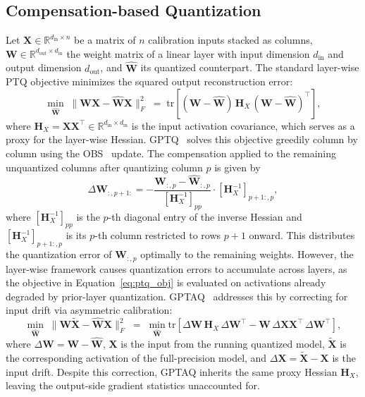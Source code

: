 \documentclass{article} %
\begin{document}
\subsection{Compensation-based Quantization}
\label{sec:bg:ptq}
Let $\mathbf{X} \in \mathbb{R}^{d_{\mathrm{in}} \times n}$ be a matrix of $n$ calibration inputs stacked as columns, $\mathbf{W} \in \mathbb{R}^{d_{\mathrm{out}} \times d_{\mathrm{in}}}$ the weight matrix of a linear layer with input dimension $d_{\mathrm{in}}$ and output dimension $d_{\mathrm{out}}$, and $\widehat{\mathbf{W}}$ its quantized counterpart. The standard layer-wise PTQ objective minimizes the squared output reconstruction error:
\begin{equation}
    \min_{\widehat{\mathbf{W}}} \; \|\mathbf{W}\mathbf{X} - \widehat{\mathbf{W}}\mathbf{X}\|_F^2
    \;=\;
    \mathrm{tr}\!\left[(\mathbf{W} - \widehat{\mathbf{W}})\, \mathbf{H}_X\, (\mathbf{W} - \widehat{\mathbf{W}})^\top\right],
    \label{eq:ptq_obj}
\end{equation}
where $\mathbf{H}_X = \mathbf{X}\mathbf{X}^\top \in \mathbb{R}^{d_{\mathrm{in}} \times d_{\mathrm{in}}}$ is the input activation covariance, which serves as a proxy for the layer-wise Hessian. GPTQ~\citep{frantar2022gptq} solves this objective greedily column by column using the OBS~\citep{hassibi1992second} update. The compensation applied to the remaining unquantized columns after quantizing column $p$ is given by
\begin{equation}
    \Delta\mathbf{W}_{:,p+1:}
    = -\frac{\mathbf{W}_{:,p} - \widehat{\mathbf{W}}_{:,p}}{[\mathbf{H}_X^{-1}]_{pp}}
      \cdot [\mathbf{H}_X^{-1}]_{p+1:,p},
    \label{eq:obs_update}
\end{equation}
where $[\mathbf{H}_X^{-1}]_{pp}$ is the $p$-th diagonal entry of the inverse Hessian and $[\mathbf{H}_X^{-1}]_{p+1:,p}$ is its $p$-th column restricted to rows $p+1$ onward. This distributes the quantization error of $\mathbf{W}_{:,p}$ optimally to the remaining weights. However, the layer-wise framework causes quantization errors to accumulate across layers, as the objective in Equation~\eqref{eq:ptq_obj} is evaluated on activations already degraded by prior-layer quantization. GPTAQ~\citep{li2025gptaq} addresses this by correcting for input drift via asymmetric calibration:
\begin{equation}
    \min_{\widehat{\mathbf{W}}} \; \|\mathbf{W}\widetilde{\mathbf{X}} - 
    \widehat{\mathbf{W}}\mathbf{X}\|_F^2
    \;=\;
    \min_{\widehat{\mathbf{W}}} \mathrm{tr}\!\left[
\Delta\mathbf{W}\,\mathbf{H}_X\,\Delta\mathbf{W}^\top 
- \mathbf{W}\,\Delta\mathbf{X}\mathbf{X}^\top\,\Delta\mathbf{W}^\top
\right],
    \label{eq:gptaq_obj}
\end{equation}
where $\Delta\mathbf{W} = \mathbf{W} - \widehat{\mathbf{W}}$, $\mathbf{X}$ is the input from the running quantized model, $\widetilde{\mathbf{X}}$ is the corresponding activation of the full-precision model, and $\Delta\mathbf{X} = \widetilde{\mathbf{X}} - \mathbf{X}$ is the input drift. Despite this correction, GPTAQ inherits the same proxy Hessian $\mathbf{H}_X$, leaving the output-side gradient statistics unaccounted for.
\end{document}
